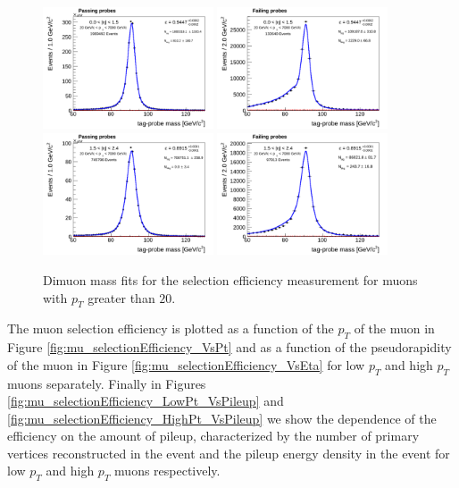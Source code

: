 \begin{figure}[!htbp]
\begin{center}
\includegraphics[width=0.45\textwidth]{figures/MuonSelectionEffMassFitPass_EtaPtBin4.pdf}
\includegraphics[width=0.45\textwidth]{figures/MuonSelectionEffMassFitFail_EtaPtBin4.pdf}
\includegraphics[width=0.45\textwidth]{figures/MuonSelectionEffMassFitPass_EtaPtBin5.pdf}
\includegraphics[width=0.45\textwidth]{figures/MuonSelectionEffMassFitFail_EtaPtBin5.pdf}
\caption{Dimuon mass fits for the selection efficiency measurement for muons with
$p_{T}$ greater than $20$\GeV.}
\label{fig:mu_selectionEfficiency_massfits_highPt}
\end{center}
\end{figure}


The muon selection efficiency is plotted as a function of the $p_{T}$ of the muon in Figure 
\ref{fig:mu_selectionEfficiency_VsPt} and as a function of the pseudorapidity of the muon
in Figure \ref{fig:mu_selectionEfficiency_VsEta} for low $p_{T}$ and high $p_{T}$ muons separately. Finally in Figures
\ref{fig:mu_selectionEfficiency_LowPt_VsPileup} and \ref{fig:mu_selectionEfficiency_HighPt_VsPileup}
we show the dependence of the efficiency on the amount of pileup, characterized by the
number of primary vertices reconstructed in the event and the pileup energy density 
in the event for low $p_{T}$ and high $p_{T}$ muons respectively.

